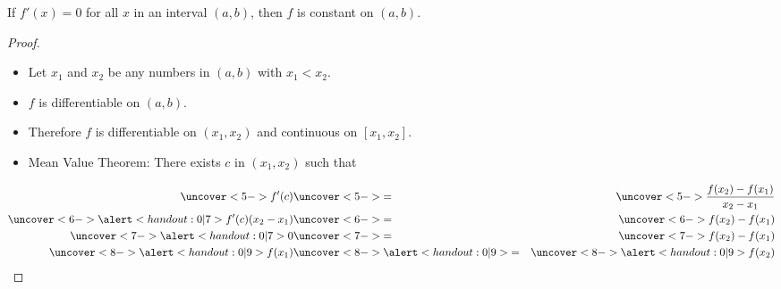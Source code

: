 \begin{frame}
\begin{theorem}
If \alert<handout:0| 3,7>{$f'(x) = 0$ for all $x$ in an interval $(a,b)$}, then $f$ is constant on $(a,b)$.
\end{theorem}
\begin{proof}
\begin{itemize}
\item<2-| alert@9>  Let $x_1$ and $x_2$ be any numbers in $(a,b)$ with $x_1 < x_2$.
\item<3->  $f$ is differentiable on $(a,b)$.
\item<4->  Therefore $f$ is differentiable on $(x_1, x_2)$ and continuous on $[x_1, x_2]$.
\item<5->  Mean Value Theorem: There exists $c$ in $(x_1, x_2)$ such that
\end{itemize}
\abovedisplayskip=0pt
\belowdisplayskip=0pt
\begin{eqnarray*}
\uncover<5->{%
f'(c)%
}%
& \uncover<5->{ = } &%
\uncover<5->{%
\frac{f(x_2)-f(x_1)}{x_2-x_1}%
}\\%
\uncover<6->{%
\alert<handout:0| 7>{f'(c)}(x_2-x_1)%
}%
& \uncover<6->{ = } &%
\uncover<6->{%
f(x_2)-f(x_1)%
}\\%
\uncover<7->{%
\alert<handout:0| 7>{0}%
}%
& \uncover<7->{ = } &%
\uncover<7->{%
f(x_2)-f(x_1)%
}\\%
\uncover<8->{%
\alert<handout:0| 9>{f(x_1)}%
}%
& \uncover<8->{\alert<handout:0| 9>{ = }} &%
\uncover<8->{%
\alert<handout:0| 9>{f(x_2)}%
}%
\end{eqnarray*}
%
\end{proof}
\end{frame}
